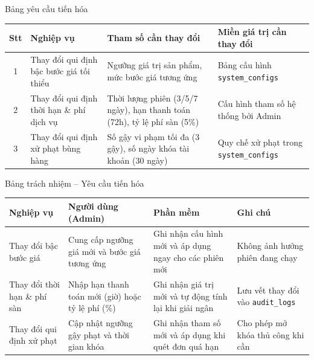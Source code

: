 \documentclass[aspectratio=169, 10pt]{beamer}
\begin{document}
\begin{frame}{Bảng yêu cầu tiến hóa}
    \footnotesize
    \begin{table}[h]
        \centering
        \begin{tabular}{c p{3.5cm} p{4.2cm} p{3.6cm}}
            \toprule
            \textbf{Stt} & \textbf{Nghiệp vụ} & \textbf{Tham số cần thay đổi} & \textbf{Miền giá trị cần thay đổi} \\
            \midrule
            1 & Thay đổi qui định bậc bước giá tối thiểu & Ngưỡng giá trị sản phẩm, mức bước giá tương ứng & Bảng cấu hình \texttt{system\_configs} \\
            \midrule
            2 & Thay đổi qui định thời hạn \& phí dịch vụ & Thời lượng phiên (3/5/7 ngày), hạn thanh toán (72h), tỷ lệ phí sàn (5\%) & Cấu hình tham số hệ thống bởi Admin \\
            \midrule
            3 & Thay đổi qui định xử phạt bùng hàng & Số gậy vi phạm tối đa (3 gậy), số ngày khóa tài khoản (30 ngày) & Quy chế xử phạt trong \texttt{system\_configs} \\
            \bottomrule
        \end{tabular}
    \end{table}
\end{frame}

\begin{frame}{Bảng trách nhiệm -- Yêu cầu tiến hóa}
    \footnotesize
    \begin{table}[h]
        \centering
        \begin{tabular}{p{3.0cm} p{3.5cm} p{3.8cm} p{2.8cm}}
            \toprule
            \textbf{Nghiệp vụ} & \textbf{Người dùng (Admin)} & \textbf{Phần mềm} & \textbf{Ghi chú} \\
            \midrule
            Thay đổi bậc bước giá & Cung cấp ngưỡng giá mới và bước giá tương ứng & Ghi nhận cấu hình mới và áp dụng ngay cho các phiên mới & Không ảnh hưởng phiên đang chạy \\
            \midrule
            Thay đổi thời hạn \& phí sàn & Nhập hạn thanh toán mới (giờ) hoặc tỷ lệ phí (\%) & Ghi nhận giá trị mới và tự động tính lại khi giải ngân & Lưu vết thay đổi vào \texttt{audit\_logs} \\
            \midrule
            Thay đổi qui định xử phạt & Cập nhật ngưỡng gậy phạt và thời gian khóa & Ghi nhận tham số mới và áp dụng khi quét đơn quá hạn & Cho phép mở khóa thủ công khi cần \\
            \bottomrule
        \end{tabular}
    \end{table}
\end{frame}
\end{document}
